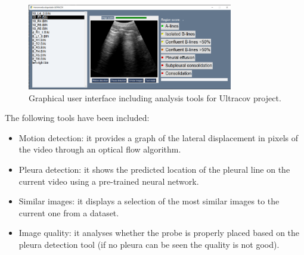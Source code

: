 \documentclass[11pt]{article} %
\begin{document}
		\begin{figure}[h]
	\centering
	\includegraphics[width=0.8\textwidth]{figuras/ultracov_GUI.png}
	\caption{Graphical user interface including analysis tools for Ultracov project.}
	\end{figure}
	
	
	The following tools have been included:
	\begin{itemize}
	\item Motion detection: it provides a graph of the lateral displacement in pixels of the video through an optical flow algorithm.
	\item Pleura detection: it shows the predicted location of the pleural line on the current video using a pre-trained neural network.
	\item Similar images: it displays a selection of the most similar images to the current one from a dataset.
	\item Image quality: it analyses whether the probe is properly placed based on the pleura detection tool (if no pleura can be seen the quality is not good).
	\end{itemize}
	

	

\newpage
\newpage


\end{document}
